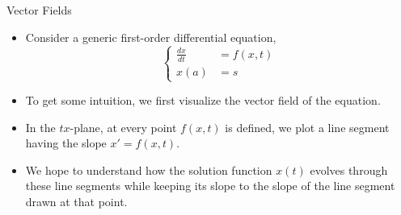\documentclass{beamer}
\newcommand{\beforeverb}{\scriptsize}
\newcommand{\afterverb}{\normalsize}
\begin{document}
\begin{frame}{Vector Fields}
\begin{itemize}
\item Consider a generic first-order differential equation,
\beforeverb
\[
\left\{
\begin{split}
\frac{dx}{dt}&=f(x,t)\\ 
x(a) &= s
\end{split}\right.
\]
\afterverb
\item To get some intuition, we first visualize the \alert{vector field} of the equation.
\item In the $tx$-plane, at every point $f(x, t)$ is defined, we plot a line segment having the slope $x'=f(x,t)$. 
\item We hope to understand how the \alert{ solution function $x(t)$} evolves through these line segments  while keeping its slope  to the slope of the line segment drawn at that point.
\end{itemize}
\end{frame}
\end{document}

